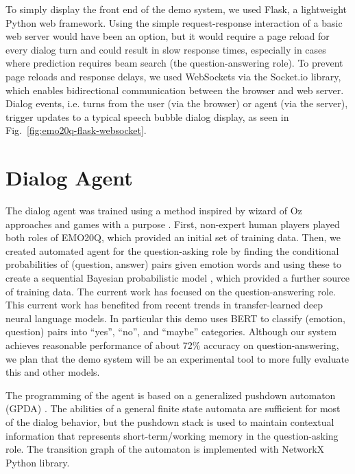 \documentclass[conference]{IEEEtran}
\begin{document}
To simply display the front end of the demo system, we used Flask, a
lightweight Python web framework.  Using the simple request-response
interaction of a basic web server would have been an option, but it
would require a page reload for every dialog turn and could result in
slow response times, especially in cases where prediction requires
beam search (the question-answering role).  To prevent page reloads
and response delays, we used WebSockets via the Socket.io library,
which enables bidirectional communication between the browser and
web server.  Dialog events, i.e. turns from the user (via the browser)
or agent (via the server), trigger updates to a typical speech bubble
dialog display, as seen in Fig.~\ref{fig:emo20q-flask-websocket}.

\section{Dialog Agent}

The dialog agent was trained using a method inspired by wizard of Oz
approaches \cite{Fraser1991} and games with a purpose
\cite{Ahn2004}. First, non-expert human players played both roles of
EMO20Q, which provided an initial set of training data. Then, we
created automated agent for the question-asking role by finding the
conditional probabilities of (question, answer) pairs given emotion
words and using these to create a sequential Bayesian probabilistic
model \cite{Kazemzadeh2012}, which provided a further source of
training data.  The current work has focused on the question-answering
role.  This current work has benefited from recent trends in
transfer-learned deep neural language models.  In particular
this demo uses BERT \cite{Devlin2019} to classify (emotion, question)
pairs into ``yes'', ``no'', and ``maybe'' categories. Although our
system achieves reasonable performance of about 72\% accuracy on
question-answering, we plan that the demo system will be an
experimental tool to more fully evaluate this and other models.

The programming of the agent is based on a generalized pushdown
automaton (GPDA) \cite{Allauzen2012}.  The abilities of a general
finite state automata are sufficient for most of the dialog behavior,
but the pushdown stack is used to maintain contextual information that
represents short-term/working memory in the question-asking role. The
transition graph of the automaton is implemented with NetworkX Python
library.
\end{document}
